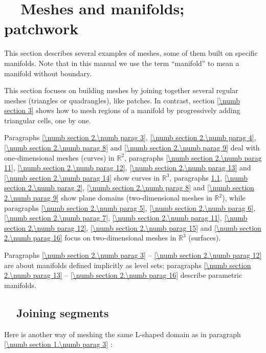 
\chapter{~~Meshes and manifolds; patchwork}\label{\numb section 2}

This section describes several examples of meshes, some of them built on specific manifolds.
Note that in this manual we use the term ``manifold'' to mean a manifold without boundary.

This section focuses on building meshes by joining together several regular meshes
(triangles or quadrangles), like patches.
In contrast, section \ref{\numb section 3} shows how to mesh regions of a manifold
by progressively adding triangular cells, one by one.

Paragraphs \ref{\numb section 2.\numb parag 3}, \ref{\numb section 2.\numb parag 4},
\ref{\numb section 2.\numb parag 8} and \ref{\numb section 2.\numb parag 9} deal
with one-dimensional meshes (curves) in $ \mathbb{R}^2 $,
paragraphs \ref{\numb section 2.\numb parag 11}, \ref{\numb section 2.\numb parag 12},
\ref{\numb section 2.\numb parag 13} and \ref{\numb section 2.\numb parag 14} show
curves in $ \mathbb{R}^3 $,
paragraphs \ref{\numb section 2.\numb parag 1}, \ref{\numb section 2.\numb parag 2},
\ref{\numb section 2.\numb parag 8} and \ref{\numb section 2.\numb parag 9} show
plane domains (two-dimensional meshes in $ \mathbb{R}^2 $),
while paragraphs \ref{\numb section 2.\numb parag 5}, \ref{\numb section 2.\numb parag 6},
\ref{\numb section 2.\numb parag 7}, \ref{\numb section 2.\numb parag 11},
\ref{\numb section 2.\numb parag 12}, \ref{\numb section 2.\numb parag 15} and
\ref{\numb section 2.\numb parag 16} focus on two-dimensional meshes
in $ \mathbb{R}^3 $ (surfaces).

Paragraphs \ref{\numb section 2.\numb parag 3} -- \ref{\numb section 2.\numb parag 12}
are about manifolds defined implicitly as level sets;
paragraphs \ref{\numb section 2.\numb parag 13} -- \ref{\numb section 2.\numb parag 16}
describe parametric manifolds.


\section{~~Joining segments}\label{\numb section 2.\numb parag 1}

Here is another way of meshing the same L-shaped domain as in paragraph
\ref{\numb section 1.\numb parag 3} :

